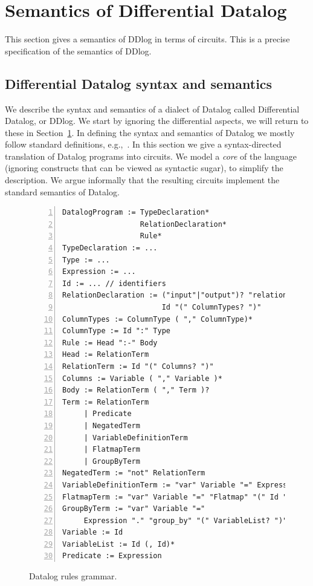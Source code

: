 \section{Semantics of Differential Datalog}\label{sec:ddlog}\label{sec:datalog}

This section gives a semantics of DDlog in terms of \dbsp circuits.
This is a precise specification of the semantics of DDlog.

\subsection{Differential Datalog syntax and semantics}\label{sec:datalog-syntax}

We describe the syntax and semantics of a dialect of Datalog called Differential Datalog,
or DDlog.  We start by ignoring the differential aspects, we will return to these in Section~\ref{sec:ddlog}.
In defining the syntax and semantics of Datalog we mostly follow standard definitions, e.g.,~\cite{Abiteboul-book95}.
In this section we give a syntax-directed translation of Datalog programs into circuits.
We model a \emph{core} of the language (ignoring constructs that can be viewed as syntactic sugar), 
to simplify the description.  We argue informally that the resulting circuits implement the standard
semantics of Datalog.

\begin{figure}[t]
{\small
\begin{lstlisting}[numbers=left]
DatalogProgram := TypeDeclaration*
                  RelationDeclaration* 
                  Rule*
TypeDeclaration := ...
Type := ...
Expression := ...
Id := ... // identifiers
RelationDeclaration := ("input"|"output")? "relation"
                       Id "(" ColumnTypes? ")"
ColumnTypes := ColumnType ( "," ColumnType)*
ColumnType := Id ":" Type
Rule := Head ":-" Body
Head := RelationTerm
RelationTerm := Id "(" Columns? ")"
Columns := Variable ( "," Variable )*
Body := RelationTerm ( "," Term )?
Term := RelationTerm 
     | Predicate 
     | NegatedTerm 
     | VariableDefinitionTerm
     | FlatmapTerm
     | GroupByTerm
NegatedTerm := "not" RelationTerm
VariableDefinitionTerm := "var" Variable "=" Expression
FlatmapTerm := "var" Variable "=" "Flatmap" "(" Id ")"
GroupByTerm := "var" Variable "=" 
     Expression "." "group_by" "(" VariableList? ")"
Variable := Id     
VariableList := Id (, Id)*
Predicate := Expression
\end{lstlisting}
}
\caption{Datalog rules grammar.\label{fig:grammar}}
\end{figure}

